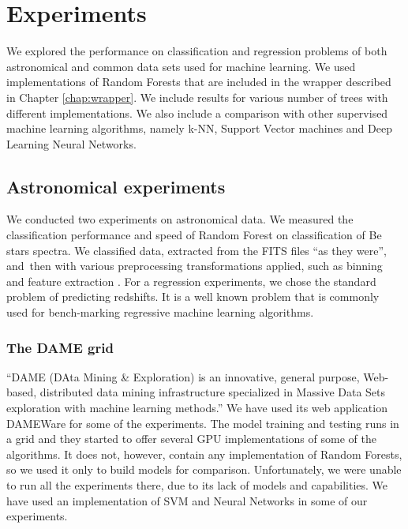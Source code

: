 \documentclass[thesis=B,english]{FITthesis}[2012/10/20]
\begin{document}
\chapter{Experiments}
\label{chap:Experiments}
We explored the performance on classification and regression problems of both astronomical and common data sets used for machine learning. We used implementations of Random Forests that are included in the wrapper described in Chapter \ref{chap:wrapper}. We include results for various number of trees with different implementations. We also include a comparison with other supervised machine learning algorithms, namely k-NN, Support Vector machines and Deep Learning Neural Networks.
\section{Astronomical experiments}
We conducted two experiments on astronomical data. We measured the classification performance and speed of Random Forest on classification of Be stars spectra. We classified data, extracted from the FITS files  ``as they were'', and~then with various preprocessing transformations applied, such as binning and feature extraction \cite{bromovabeclass}. For a regression experiments, we chose the standard problem of predicting redshifts. It is a well known problem \cite{RED13,RED10,RED07} that is commonly used for bench-marking regressive machine learning algorithms.
\subsection{The DAME grid}
``DAME (DAta Mining \& Exploration) is an innovative, general purpose, Web-based, distributed data mining infrastructure specialized in Massive Data Sets exploration with machine learning methods.'' \cite{dame} We have used its web application DAMEWare for some of the experiments. The model training and testing runs in a grid and they started to offer several GPU implementations of some of the algorithms. It does not, however, contain any implementation of Random Forests, so we used it only to build models for comparison. Unfortunately, we were unable to run all the experiments there, due to its lack of models and capabilities. We have used an implementation of SVM and Neural Networks in some of our experiments.
\end{document}
